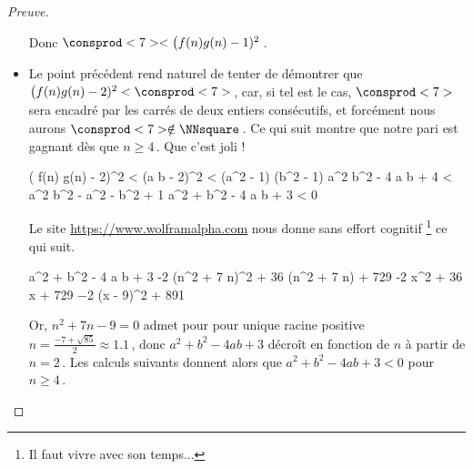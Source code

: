 \begin{proof}[Preuve]
\begin{itemize}
        \medskip
        
        \noindent
        Donc $\consprod<7> < \big( f(n) g(n) - 1)^2$\,.


		\item Le point précédent rend naturel de tenter de démontrer que 
		$\big( f(n) g(n) - 2)^2 < \consprod<7>$\,, car, si tel est le cas, 
		$\consprod<7>$ sera encadré par les carrés de deux entiers consécutifs, et forcément nous aurons $\consprod<7> \notin \NNsquare$\,. 
		Ce qui suit montre que notre pari est gagnant dès que $n \geq 4$\,. Que c'est joli !

        \medskip
        \noindent\kern-6pt%
        \begin{stepcalc}[style = ar*, ope={\iff}]
        	\big( f(n) g(n) - 2)^2 < \consprod<7>
        	(a b - 2)^2 < (a^2 - 1) (b^2 - 1)
        \explnext{}
        	a^2 b^2 - 4 a b + 4 < a^2 b^2 - a^2 - b^2 + 1
        \explnext{}
        	a^2 + b^2 - 4 a b + 3 < 0
        \end{stepcalc}

        \medskip
        \noindent
        Le site \url{https://www.wolframalpha.com} nous donne sans effort cognitif
        \footnote{
        	Il faut vivre avec son temps...
        }
        ce qui suit.%

        \medskip
        \noindent\kern-6pt%
        \begin{stepcalc}[style = ar*, ope={=}]
        	a^2 + b^2 - 4 a b + 3
        \explnext{}
        	-2 (n^2 + 7 n)^2 + 36 (n^2 + 7 n) + 729
        	-2 x^2 + 36 x + 729
        \explnext{}
        	−2 (x - 9)^2 + 891
        \end{stepcalc}
        
        \medskip
        
        \noindent
        Or, $n^2 + 7 n - 9 = 0$ admet pour pour unique racine positive $n = \frac{- 7 + \sqrt{85}}{2} \approx \num{1.1}$\,,
        donc $a^2 + b^2 - 4 a b + 3$ décroît en fonction de $n$ à partir de $n = 2$\,. Les calculs suivants donnent alors que $a^2 + b^2 - 4 a b + 3 < 0$ pour $n \geq 4$\,.
	\end{itemize}

	\begin{center}
	\end{center}


\end{proof}
